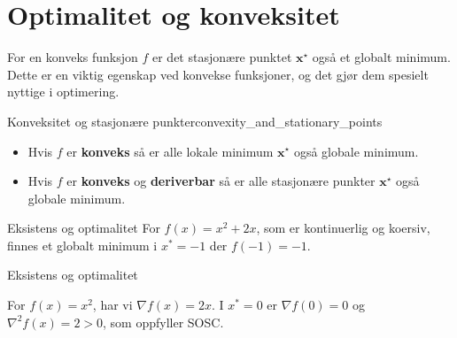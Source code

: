 \section{Optimalitet og konveksitet}
\label{sec:optimality_and_convexity}
For en konveks funksjon \(f\) er det stasjonære punktet \(\mathbf{x}^\star\) også et globalt minimum. Dette er en viktig egenskap ved konvekse funksjoner, og det gjør dem spesielt nyttige i optimering.

\begin{remark}{Konveksitet og stasjonære punkter}{convexity_and_stationary_points}
	\begin{itemize}
		\item Hvis \(f\) er \textbf{konveks} så er alle lokale minimum \(\mathbf{x}^\star\) også globale minimum.
		\item Hvis \(f\) er \textbf{konveks} og \textbf{deriverbar} så er alle stasjonære punkter \(\mathbf{x}^\star\) også globale minimum.
	\end{itemize}
\end{remark}

\begin{example}{Eksistens og optimalitet}{}
	For \( f(x) = x^2 + 2x \), som er kontinuerlig og koersiv, finnes et globalt minimum i \( x^* = -1 \) der \( f(-1) = -1 \).
\end{example}
\begin{example}{Eksistens og optimalitet}{}

	For \( f(x) = x^2 \), har vi \( \nabla f(x) = 2x \). I \( x^* = 0 \) er \( \nabla f(0) = 0 \) og \( \nabla^2 f(x) = 2 > 0 \), som oppfyller SOSC.

\end{example}

